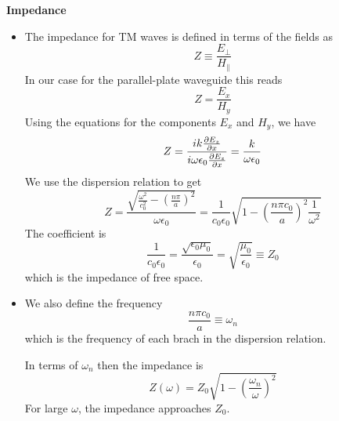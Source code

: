 \documentclass[11pt, a4paper]{article}
\renewcommand{\vec}[1]{\bm{#1}} %
\newcommand{\ee}{\epsilon_{0}}  %
\newcommand{\mm}{\mu_{0}}  %
\newcommand{\m}{\vec{m}}  %
\begin{document}
\textbf{Impedance}
\begin{itemize}
	\item The impedance for TM waves is defined in terms of the fields as
	\begin{equation*}
		Z \equiv \frac{E_{\perp}}{H_{\parallel}}
	\end{equation*}
	In our case for the parallel-plate waveguide this reads
	\begin{equation*}
		Z = \frac{E_{x}}{H_{y}}
	\end{equation*}
	Using the equations for the components $ E_{x} $ and $ H_{y} $, we have
	\begin{equation*}
		Z = \frac{ik \pdv{E_{z}}{x}}{i \omega \ee \pdv{E_{z}}{x}} = \frac{k}{\omega \ee}
	\end{equation*}
	We use the dispersion relation to get
	\begin{equation*}
		Z = \frac{\sqrt{\frac{\omega^{2}}{c_{0}^{2}} - \left(\frac{n\pi}{a}\right)^{2}}}{\omega \ee} = \frac{1}{c_{0}\ee}\sqrt{1 - \left(\frac{n\pi c_{0}}{a}\right)^{2}\frac{1}{\omega^{2}}}
	\end{equation*}
	The coefficient is
	\begin{equation*}
		\frac{1}{c_{0}\ee} = \frac{\sqrt{\ee \mm}}{\ee} = \sqrt{\frac{\mm}{\ee}} \equiv Z_{0}
	\end{equation*}
	which is the impedance of free space.
	
	\item We also define the frequency
	\begin{equation*}
		\frac{n\pi c_{0}}{a} \equiv \omega_{n}
	\end{equation*} 
	which is the frequency of each brach in the dispersion relation.
	
	In terms of $ \omega_{n} $ then the impedance is
	\begin{equation*}
		Z(\omega) = Z_{0}\sqrt{1 - \left(\frac{\omega_{n}}{\omega}\right)^{2}}
	\end{equation*}
	For large $ \omega $, the impedance approaches $ Z_{0} $. 
\end{itemize}
\end{document}
